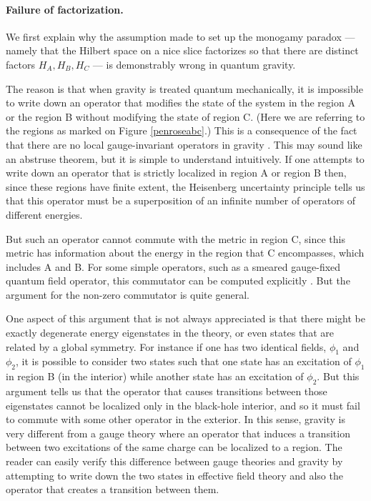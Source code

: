 \documentclass[12pt]{article}
\begin{document}
\paragraph{\bf Failure of factorization.}
We first  explain why the assumption made to set up the monogamy paradox --- namely that the  Hilbert space on a nice slice factorizes so that there are distinct factors $H_{A}, H_{B}, H_{C}$ --- is demonstrably wrong in quantum gravity.

The reason is that when gravity is treated quantum mechanically, it is impossible to write down an operator that modifies the state of the system  in the region A or the region B without modifying the state of region C. (Here we are referring to the regions as marked on Figure \ref{penroseabc}.)   This is a consequence of the fact that there are no local gauge-invariant operators in gravity \cite{dewitt1960quantization, kuchar1991problem, Giddings:2005id}. This may sound like an abstruse theorem, but it is simple to understand intuitively.  If one attempts to write down an operator that is strictly localized in region A or region B  then, since these regions have finite extent, the Heisenberg uncertainty principle tells us that this operator must be a superposition of an infinite number of operators of different energies. 

But such an operator cannot commute with the metric in region C, since this metric has information about the energy in the region that C encompasses, which includes A and B. For some simple operators, such as a smeared gauge-fixed quantum field operator, this commutator can be computed explicitly \cite{Donnelly:2018nbv}. But the argument for the non-zero commutator is quite general. 

One aspect of this argument that is not always appreciated is that there might be exactly degenerate energy eigenstates in the theory, or even states that are related by a global symmetry. For instance if one has two identical fields, $\phi_1$ and $\phi_2$, it is possible to consider two states such that one state has an excitation of $\phi_1$ in region B (in the interior) while another state has an excitation of $\phi_2$.  But this argument tells us that the operator that causes transitions between those eigenstates cannot be localized only in the black-hole interior, and so it must fail to commute with some other operator in the exterior. In this sense, gravity is very different from a gauge theory where an operator that induces a transition between two excitations of the same charge can be localized to a region.  The reader can easily verify this difference between gauge theories and gravity by attempting to write down the two states in effective field theory and also the operator that creates a transition between them.
\end{document}
